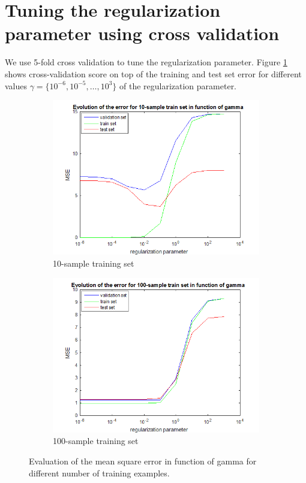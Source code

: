 \documentclass{article} %
\begin{document}
\section{Tuning the regularization parameter using cross validation}
We use 5-fold cross validation to tune the regularization parameter. Figure \ref{fig:ex6} shows cross-validation score on top of the training and test set error for different values $\gamma = \{10^{-6}, 10^{-5}, \dots, 10^3 \}$ of the regularization parameter.

\begin{figure}[h]
    \centering
    \begin{subfigure}[b]{0.45\textwidth}
        \includegraphics[width=\textwidth]{ex6_10}
        \caption{10-sample training set}
    \end{subfigure}
    \begin{subfigure}[b]{0.45\textwidth}
        \includegraphics[width=\textwidth]{ex6_100}
        \caption{100-sample training set}
    \end{subfigure}
    \caption{Evaluation of the mean square error in function of gamma for different number of training examples.}
    \label{fig:ex6}
\end{figure}
\end{document}

